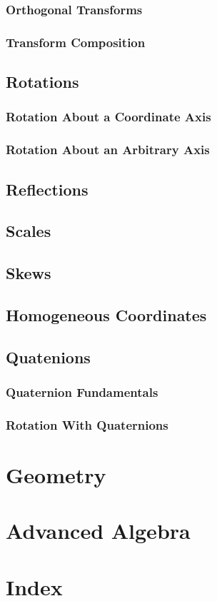 \documentclass[a4paper,10pt]{article}
\begin{document}
\subsubsection{Orthogonal Transforms}
\subsubsection{Transform Composition}
\subsection{Rotations}
\subsubsection{Rotation About a Coordinate Axis}
\subsubsection{Rotation About an Arbitrary Axis}
\subsection{Reflections}
\subsection{Scales}
\subsection{Skews}
\subsection{Homogeneous Coordinates}
\subsection{Quatenions}
\subsubsection{Quaternion Fundamentals}
\subsubsection{Rotation With Quaternions}
\section{Geometry}
\section{Advanced Algebra}
\section{Index}
\end{document}
